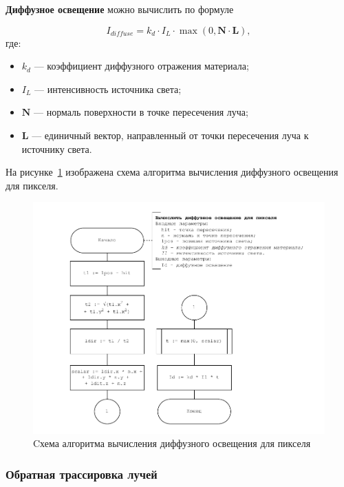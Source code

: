 \textbf{Диффузное освещение} можно вычислить по формуле

\begin{equation}
	I_{diffuse} = k_d \cdot I_L \cdot \max(0, \mathbf{N} \cdot \mathbf{L}),
\end{equation}где:
\begin{itemize}
	\item \( k_d \) — коэффициент диффузного отражения материала;
	\item \( I_L \) — интенсивность источника света;
	\item \( \mathbf{N} \) — нормаль поверхности в точке пересечения луча;
	\item \( \mathbf{L} \) — единичный вектор, направленный от точки пересечения луча к источнику света.
\end{itemize}

На рисунке~\ref{fig:phong-diff} изображена схема алгоритма вычисления диффузного освещения для пикселя.

\begin{figure}[ht!]
	\begin{center}
		\includegraphics[scale=1.0]{diag/main-phong-diffuse.pdf}
	\end{center}
	\caption{Cхема алгоритма вычисления диффузного освещения для пикселя}
	\label{fig:phong-diff}
\end{figure}

\subsubsection{Обратная трассировка лучей}


